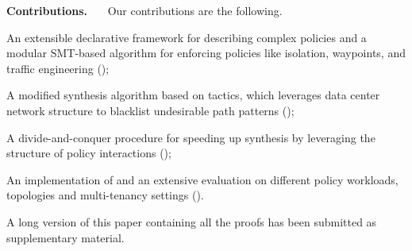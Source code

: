 \noindent \textbf{Contributions.} \ \ \ Our contributions are the following.
\begin{compactitemize}
\item An extensible declarative framework for describing
  complex policies and a modular SMT-based algorithm for enforcing policies
  like isolation, waypoints, and traffic engineering ();
\item A modified synthesis algorithm based on tactics, which leverages data center network structure
  to blacklist undesirable path patterns ();
\item A divide-and-conquer procedure for speeding up synthesis by leveraging the 
structure of policy interactions ();
\item An implementation of \Name and an extensive evaluation on different policy workloads, topologies and multi-tenancy settings ().
\end{compactitemize}

\iffull\else
A long version
of this paper containing all the proofs has been submitted as supplementary material.
\fi
